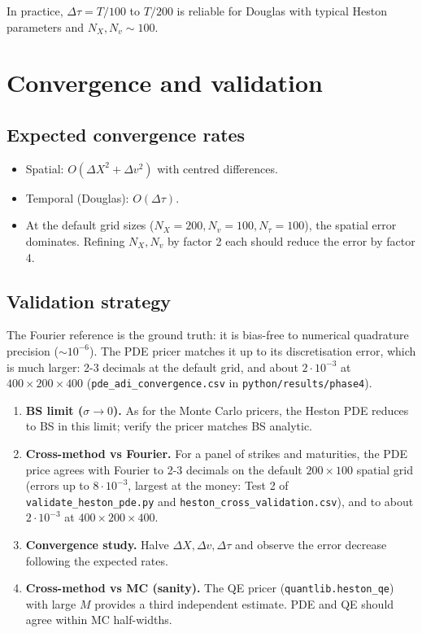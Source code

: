 \documentclass[11pt]{article}
\theoremstyle{plain}
\theoremstyle{definition}
\theoremstyle{remark}
\begin{document}
In practice, $\Delta\tau = T / 100$ to $T / 200$ is reliable for Douglas with typical Heston parameters and $N_X, N_v \sim 100$.

\section{Convergence and validation}

\subsection{Expected convergence rates}

\begin{itemize}[topsep=2pt]
    \item Spatial: $O(\Delta X^2 + \Delta v^2)$ with centred differences.
    \item Temporal (Douglas): $O(\Delta\tau)$.
    \item At the default grid sizes ($N_X = 200, N_v = 100, N_\tau = 100$), the spatial error dominates. Refining $N_X, N_v$ by factor 2 each should reduce the error by factor 4.
\end{itemize}

\subsection{Validation strategy}

The Fourier reference is the ground truth: it is bias-free to numerical quadrature precision ($\sim 10^{-6}$). The PDE pricer matches it up to its discretisation error, which is much larger: 2-3 decimals at the default grid, and about $2 \cdot 10^{-3}$ at $400 \times 200 \times 400$ (\texttt{pde\_adi\_convergence.csv} in \texttt{python/results/phase4}).

\begin{enumerate}[topsep=2pt]
    \item \textbf{BS limit ($\sigma \to 0$).} As for the Monte Carlo pricers, the Heston PDE reduces to BS in this limit; verify the pricer matches BS analytic.
    \item \textbf{Cross-method vs Fourier.} For a panel of strikes and maturities, the PDE price agrees with Fourier to 2-3 decimals on the default $200 \times 100$ spatial grid (errors up to $8 \cdot 10^{-3}$, largest at the money: Test 2 of \texttt{validate\_heston\_pde.py} and \texttt{heston\_cross\_validation.csv}), and to about $2 \cdot 10^{-3}$ at $400 \times 200 \times 400$.
    \item \textbf{Convergence study.} Halve $\Delta X, \Delta v, \Delta\tau$ and observe the error decrease following the expected rates.
    \item \textbf{Cross-method vs MC (sanity).} The QE pricer (\texttt{quantlib.heston\_qe}) with large $M$ provides a third independent estimate. PDE and QE should agree within MC half-widths.
\end{enumerate}
\end{document}
